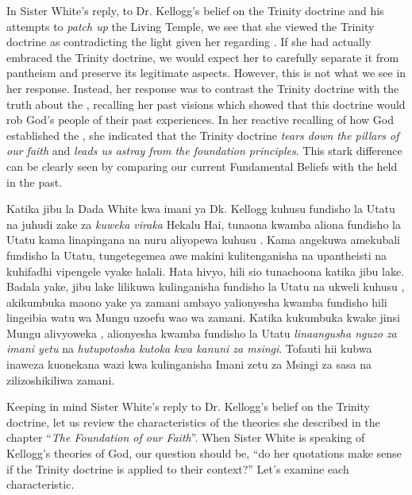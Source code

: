 



In Sister White's reply, to Dr. Kellogg's belief on the Trinity doctrine and his attempts to \textit{patch up} the Living Temple, we see that she viewed the Trinity doctrine as contradicting the light given her regarding . If she had actually embraced the Trinity doctrine, we would expect her to carefully separate it from pantheism and preserve its legitimate aspects. However, this is not what we see in her response. Instead, her response was to contrast the Trinity doctrine with the truth about the , recalling her past visions which showed that this doctrine would rob God's people of their past experiences. In her reactive recalling of how God established the , she indicated that the Trinity doctrine \textit{tears down the pillars of our faith} and \textit{leads us astray from the foundation principles}. This stark difference can be clearly seen by comparing our current Fundamental Beliefs with the  held in the past.


Katika jibu la Dada White kwa imani ya Dk. Kellogg kuhusu fundisho la Utatu na juhudi zake za \textit{kuweka viraka} Hekalu Hai, tunaona kwamba aliona fundisho la Utatu kama linapingana na nuru aliyopewa kuhusu . Kama angekuwa amekubali fundisho la Utatu, tungetegemea awe makini kulitenganisha na upantheisti na kuhifadhi vipengele vyake halali. Hata hivyo, hili sio tunachoona katika jibu lake. Badala yake, jibu lake lilikuwa kulinganisha fundisho la Utatu na ukweli kuhusu , akikumbuka maono yake ya zamani ambayo yalionyesha kwamba fundisho hili lingeibia watu wa Mungu uzoefu wao wa zamani. Katika kukumbuka kwake jinsi Mungu alivyoweka , alionyesha kwamba fundisho la Utatu \textit{linaangusha nguzo za imani yetu} na \textit{hutupotosha kutoka kwa kanuni za msingi}. Tofauti hii kubwa inaweza kuonekana wazi kwa kulinganisha Imani zetu za Msingi za sasa na  zilizoshikiliwa zamani.


Keeping in mind Sister White’s reply to Dr. Kellogg's belief on the Trinity doctrine, let us review the characteristics of the theories she described in the chapter “\textit{The Foundation of our Faith}”. When Sister White is speaking of Kellogg’s theories of God, our question should be, “do her quotations make sense if the Trinity doctrine is applied to their context?” Let’s examine each characteristic.


